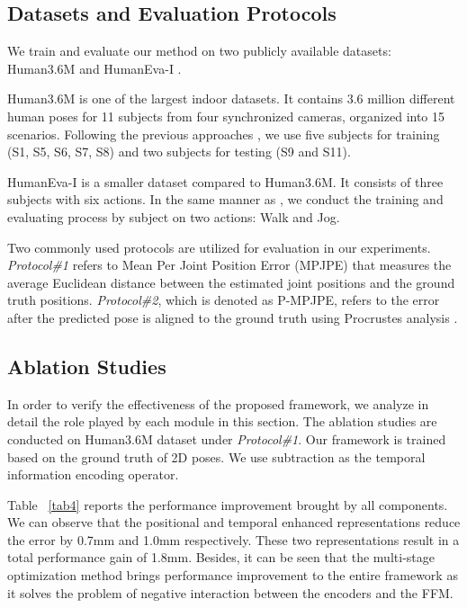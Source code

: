\documentclass[sigconf]{acmart}
\begin{document}
\subsection{Datasets and Evaluation Protocols}
We train and evaluate our method on two publicly available datasets: Human3.6M \cite{ionescu2013human3} and HumanEva-I \cite{sigal2010humaneva}. 

Human3.6M is one of the largest indoor datasets. It contains 3.6 million different human poses for 11 subjects from four synchronized cameras, organized into 15 scenarios. Following the previous approaches \cite{martinez2017simple,liu2020attention,jllo20193d,wang2019not}, we use five subjects for training (S1, S5, S6, S7, S8) and two subjects for testing (S9 and S11). 

HumanEva-I is a smaller dataset compared to Human3.6M. It consists of three subjects with six actions. In the same manner as \cite{liu2020attention,pavlakos2017coarse}, we conduct the training and evaluating process by subject on two actions: Walk and Jog.

Two commonly used protocols are utilized for evaluation in our experiments. \textit{Protocol\#1} refers to Mean Per Joint Position Error (MPJPE) that measures the average Euclidean distance between the estimated joint positions and the ground truth positions. \textit{Protocol\#2}, which is denoted as P-MPJPE, refers to the error after the predicted pose is aligned to the ground truth using Procrustes analysis \cite{gower1975generalized}.







\subsection{Ablation Studies}\label{ablation}
In order to verify the effectiveness of the proposed framework, we analyze in detail the role played by each module in this section. The ablation studies are conducted on Human3.6M dataset under \textit{Protocol\#1}. Our framework is trained based on the ground truth of 2D poses. We use subtraction as the temporal information encoding operator.



Table ~\ref{tab4} reports the performance improvement brought by all components. We can observe that the positional and temporal enhanced representations reduce the error by 0.7mm and 1.0mm respectively. These two representations result in a total performance gain of 1.8mm. Besides, it can be seen that the multi-stage optimization method brings performance improvement to the entire framework as it solves the problem of negative interaction between the encoders and the FFM.\\
\end{document}
